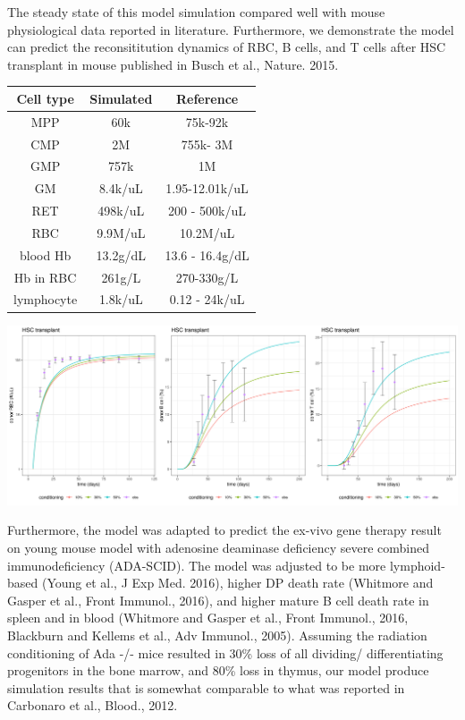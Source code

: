 \documentclass[a0paper,portrait]{baposter}
\begin{document}
\begin{poster}
{The steady state of this model simulation compared well with mouse physiological data reported in literature. 
Furthermore, we demonstrate the model can predict the reconsititution dynamics of RBC, B cells, and T cells after HSC transplant in mouse published in Busch et al., Nature. 2015.  

\begin{minipage}[ht]{0.42\linewidth}
\begin{center}
\begin{tabular}{ c c c }
Cell type & Simulated & Reference \\ 
\hline
MPP & 60k & 75k-92k \\  
CMP & 2M & 755k- 3M  \\
GMP & 757k & 1M  \\  
GM & 8.4k/uL & 1.95-12.01k/uL \\  
RET & 498k/uL & 200 - 500k/uL   \\    
RBC & 9.9M/uL & 10.2M/uL   \\ 
blood Hb & 13.2g/dL & 13.6 - 16.4g/dL   \\ 
Hb in RBC & 261g/L & 270-330g/L  \\ 
lymphocyte & 1.8k/uL & 0.12 - 24k/uL  \\ 
\hline
\end{tabular}
\end{center}
\end{minipage}
\hspace{0.2cm}
\begin{minipage}[ht]{0.5\linewidth}
\includegraphics[width=\textwidth]{../img/mouse_RBC_T_B_HSCT.png}
\end{minipage}

Furthermore, the model was adapted to predict the ex-vivo gene therapy result on young mouse model with adenosine deaminase deficiency severe combined immunodeficiency (ADA-SCID). 
The model was adjusted to be more lymphoid-based (Young et al., J Exp Med. 2016), higher DP death rate (Whitmore and Gasper et al., Front Immunol., 2016), and higher mature B cell death rate in spleen and in blood (Whitmore and Gasper et al., Front Immunol., 2016, Blackburn and Kellems et al., Adv Immunol., 2005).
Assuming the radiation conditioning of Ada -/- mice resulted in 30\% loss of all dividing/ differentiating progenitors in the bone marrow, and 80\% loss in thymus, our model produce simulation results that is somewhat comparable to what was reported in Carbonaro et al., Blood., 2012. 


}
\end{poster}
\end{document}
